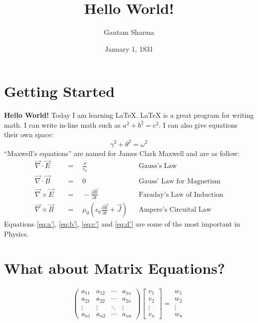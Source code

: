 \documentclass{article}
\title{Hello World!}
\author{Gautam Sharma}
\date{January 1, 1831}
\begin{document}
\maketitle

\section{Getting Started}
\textbf{Hello World!} Today I am learning \LaTeX. \LaTeX \hspace{0.05 cm} is a great program for writing math. I can write in-line math such as $a^2+b^2=c^2$. I can also give equations their own space:
\begin{equation}
    \gamma^2+\theta^2=\omega^2
\end{equation}
``Maxwell's equations'' are named for James Clark Maxwell and are as follow:
\begin{align}
  \vec{\nabla} \cdot \vec{E}\quad  & = \quad\frac{\rho}{\epsilon_0} & & \text{Gauss's Law}\label{eq:a’} \\
  \vec{\nabla} \cdot \vec{B}\quad  & = \quad0  & &  \text{Gauss' Law for Magnetism}\label{eq:b’} \\
  \vec{\nabla} \times \vec{E}\quad  & = \quad-\frac{\partial \vec{B}}{\partial t} & & \text{Faraday's Law of Induction}\label{eq:c’} \\
  \vec{\nabla} \times \vec{B}\quad  & = \quad\mu_0 \left(\epsilon_0 \frac{\partial \vec{E}}{\partial t} + \vec{J}\right)  & &  \text{Ampere's Circuital Law}\label{eq:d’}
\end{align}
Equations \textcolor{blue}{\ref{eq:a’}, \ref{eq:b’}, \ref{eq:c’}} and \textcolor{blue}{\ref{eq:d’}} are some of the most important in Physics.

\section{What about Matrix Equations?}
\begin{align*}
 \begin{pmatrix}
  a_{11} & a_{12} & \cdots & a_{1n}\\ 
  a_{21} & a_{22} & \cdots & a_{2n}\\
  \vdots & \vdots & \ddots & \vdots\\
  a_{n1} & a_{n2} & \cdots & a_{nn}
\end{pmatrix}
\begin{bmatrix}
v_1\\
v_2\\
\vdots\\
v_n
\end{bmatrix}
=
\begin{matrix}
w_1\\
w_2\\
\vdots\\
w_n
\end{matrix}
\end{align*}
\end{document}
